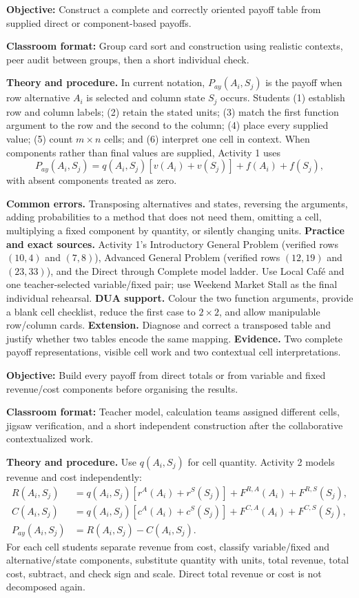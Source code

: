 \documentclass[10pt,letterpaper]{article}
\newcommand{\labelled}[2]{\textbf{#1:} #2\par}
\newcommand{\partheading}[1]{\Needspace{6\baselineskip}\par\vspace{5pt}{\bfseries #1\par}\vspace{1pt}}
\begin{document}
\begin{bluebox}
		\partheading{Part 2---C2: Organise Supplied Payoffs}
		\labelled{Objective}{Construct a complete and correctly oriented payoff table from supplied direct or component-based payoffs.}
		\labelled{Classroom format}{Group card sort and construction using realistic contexts, peer audit between groups, then a short individual check.}
		\textbf{Theory and procedure.} In current notation, $P_{ay}(A_i,S_j)$ is the
		payoff when row alternative $A_i$ is selected and column state $S_j$ occurs.
		Students (1) establish row and column labels; (2) retain the stated units;
		(3) match the first function argument to the row and the second to the column;
		(4) place every supplied value; (5) count $m\times n$ cells; and (6) interpret
		one cell in context. When components rather than final values are supplied,
		Activity 1 uses
		\[
		P_{ay}(A_i,S_j)=q(A_i,S_j)[v(A_i)+v(S_j)]+f(A_i)+f(S_j),
		\]
		with absent components treated as zero.
		
		\textbf{Common errors.} Transposing alternatives and states, reversing the
		arguments, adding probabilities to a method that does not need them, omitting
		a cell, multiplying a fixed component by quantity, or silently changing units.
		\textbf{Practice and exact sources.} Activity 1's Introductory General Problem
		(verified rows $(10,4)$ and $(7,8)$), Advanced General Problem (verified rows
		$(12,19)$ and $(23,33)$), and the Direct through Complete model ladder. Use
		Local Caf\'e and one teacher-selected variable/fixed pair; use Weekend Market
		Stall as the final individual rehearsal. \textbf{DUA support.} Colour the two
		function arguments, provide a blank cell checklist, reduce the first case to
		$2\times2$, and allow manipulable row/column cards. \textbf{Extension.} Diagnose
		and correct a transposed table and justify whether two tables encode the same
		mapping. \textbf{Evidence.} Two complete payoff representations, visible cell
		work and two contextual cell interpretations.
		
		\partheading{Part 3---C3: Calculate Revenue, Cost and Profit}
		\labelled{Objective}{Build every payoff from direct totals or from variable and fixed revenue/cost components before organising the results.}
		\labelled{Classroom format}{Teacher model, calculation teams assigned different cells, jigsaw verification, and a short independent construction after the collaborative contextualized work.}
		\textbf{Theory and procedure.} Use $q(A_i,S_j)$ for cell quantity. Activity 2
		models revenue and cost independently:
		\[
		\begin{aligned}
			R(A_i,S_j)&=q(A_i,S_j)[r^A(A_i)+r^S(S_j)]
			+F^{R,A}(A_i)+F^{R,S}(S_j),\\
			C(A_i,S_j)&=q(A_i,S_j)[c^A(A_i)+c^S(S_j)]
			+F^{C,A}(A_i)+F^{C,S}(S_j),\\
			P_{ay}(A_i,S_j)&=R(A_i,S_j)-C(A_i,S_j).
		\end{aligned}
		\]
		For each cell students separate revenue from cost, classify variable/fixed and
		alternative/state components, substitute quantity with units, total revenue,
		total cost, subtract, and check sign and scale. Direct total revenue or cost is
		not decomposed again.
		

\end{bluebox}
\end{document}
